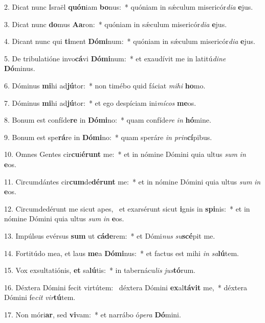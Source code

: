 2. Dicat nunc Israël \textbf{quón}iam \textbf{bo}nus:~*  quóniam in sǽculum misericór\textit{di}\textit{a} \textbf{e}jus.\

3. Dicat nunc \textbf{do}mus \textbf{A}\textbf{a}ron:~*  quóniam in sǽculum misericór\textit{di}\textit{a} \textbf{e}jus.\

4. Dicant nunc qui \textbf{ti}ment \textbf{Dó}\textbf{mi}num:~*  quóniam in sǽculum misericór\textit{di}\textit{a} \textbf{e}jus.\

5. De tribulatióne invo\textbf{cá}vi \textbf{Dó}\textbf{mi}num:~*  et exaudívit me in latitú\textit{di}\textit{ne} \textbf{Dó}minus.\

6. Dóminus \textbf{mi}hi ad\textbf{jú}tor:~*  non timébo quid fáciat \textit{mi}\textit{hi} \textbf{ho}mo.\

7. Dóminus \textbf{mi}hi ad\textbf{jú}tor:~*  et ego despíciam ini\textit{mí}\textit{cos} \textbf{me}os.\

8. Bonum est confíde\textbf{re} in \textbf{Dó}\textbf{mi}no:~*  quam confíde\textit{re} \textit{in} \textbf{hó}mine.\

9. Bonum est spe\textbf{rá}re in \textbf{Dó}\textbf{mi}no:~*  quam speráre \textit{in} \textit{prin}\textbf{cí}pibus.\

10. Omnes Gentes cir\textbf{cu}i\textbf{é}\textbf{runt} me:~*  et in nómine Dómini quia ultus \textit{sum} \textit{in} \textbf{e}os.\

11. Circumdántes cir\textbf{cum}de\textbf{dé}\textbf{runt} me:~*  et in nómine Dómini quia ultus \textit{sum} \textit{in} \textbf{e}os.\

12. Circumdedérunt me sicut apes, \dag\  et exarsérunt sicut \textbf{i}gnis in \textbf{spi}nis:~*  et in nómine Dómini quia ultus \textit{sum} \textit{in} \textbf{e}os.\

13. Impúlsus evérsus \textbf{sum} ut \textbf{cá}\textbf{de}rem:~*  et Dómi\textit{nus} \textit{su}\textbf{scé}pit me.\

14. Fortitúdo mea, et laus \textbf{me}a \textbf{Dó}\textbf{mi}nus:~*  et factus est mihi \textit{in} \textit{sa}\textbf{lú}tem.\

15. Vox exsultatiónis, \textbf{et} sa\textbf{lú}tis:~*  in tabernácu\textit{lis} \textit{jus}\textbf{tó}rum.\

16. Déxtera Dómini fecit virtútem: \dag\  déxtera Dómini \textbf{ex}al\textbf{tá}\textbf{vit} me,~*  déxtera Dómini fe\textit{cit} \textit{vir}\textbf{tú}tem.\

17. Non móri\textbf{ar}, sed \textbf{vi}vam:~*  et narrábo ó\textit{pe}\textit{ra} \textbf{Dó}mini.\

